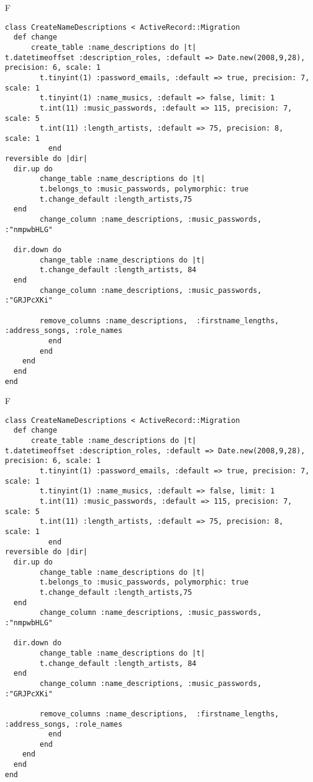 F
\begin{verbatim}
class CreateNameDescriptions < ActiveRecord::Migration
  def change
	  create_table :name_descriptions do |t|
t.datetimeoffset :description_roles, :default => Date.new(2008,9,28), precision: 6, scale: 1
		t.tinyint(1) :password_emails, :default => true, precision: 7, scale: 1
		t.tinyint(1) :name_musics, :default => false, limit: 1
		t.int(11) :music_passwords, :default => 115, precision: 7, scale: 5
		t.int(11) :length_artists, :default => 75, precision: 8, scale: 1
		  end
reversible do |dir|
  dir.up do
		change_table :name_descriptions do |t|
		t.belongs_to :music_passwords, polymorphic: true
 		t.change_default :length_artists,75
  end
 		change_column :name_descriptions, :music_passwords, :"nmpwbHLG"
   
  dir.down do
		change_table :name_descriptions do |t|
		t.change_default :length_artists, 84
  end
 		change_column :name_descriptions, :music_passwords, :"GRJPcXKi"
   
		remove_columns :name_descriptions,  :firstname_lengths, :address_songs, :role_names 
	      end
	    end
    end 
  end
end

\end{verbatim}

F
\begin{verbatim}
class CreateNameDescriptions < ActiveRecord::Migration
  def change
	  create_table :name_descriptions do |t|
t.datetimeoffset :description_roles, :default => Date.new(2008,9,28), precision: 6, scale: 1
		t.tinyint(1) :password_emails, :default => true, precision: 7, scale: 1
		t.tinyint(1) :name_musics, :default => false, limit: 1
		t.int(11) :music_passwords, :default => 115, precision: 7, scale: 5
		t.int(11) :length_artists, :default => 75, precision: 8, scale: 1
		  end
reversible do |dir|
  dir.up do
		change_table :name_descriptions do |t|
		t.belongs_to :music_passwords, polymorphic: true
 		t.change_default :length_artists,75
  end
 		change_column :name_descriptions, :music_passwords, :"nmpwbHLG"
   
  dir.down do
		change_table :name_descriptions do |t|
		t.change_default :length_artists, 84
  end
 		change_column :name_descriptions, :music_passwords, :"GRJPcXKi"
   
		remove_columns :name_descriptions,  :firstname_lengths, :address_songs, :role_names 
	      end
	    end
    end 
  end
end

\end{verbatim}

